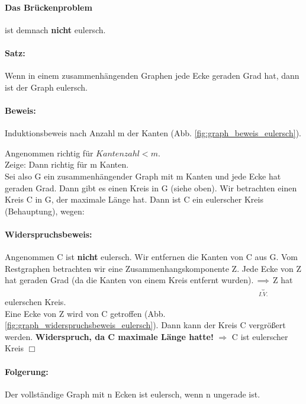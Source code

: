 \paragraph{Das Brückenproblem} ist demnach \textbf{nicht} eulersch. 

\paragraph{Satz:} Wenn in einem zusammenhängenden Graphen jede Ecke geraden Grad hat, dann ist der Graph eulersch. 

\paragraph{Beweis:} Induktionsbeweis nach Anzahl m der Kanten (Abb. \ref{fig:graph_beweis_eulersch}).




Angenommen richtig für $Kantenzahl < m$. \\
Zeige: Dann richtig für m Kanten.\\
Sei also G ein zusammenhängender Graph mit m Kanten und jede Ecke hat geraden Grad. Dann gibt es einen Kreis in G (siehe oben). Wir betrachten einen Kreis C in G, der maximale Länge hat. Dann ist C ein eulerscher Kreis (Behauptung), wegen: \\

\paragraph{Widerspruchsbeweis:} Angenommen C ist \textbf{nicht} eulersch. Wir entfernen die Kanten von C aus G. Vom Restgraphen betrachten wir eine Zusammenhangskomponente Z. Jede Ecke von Z hat geraden Grad (da die Kanten von einem Kreis entfernt wurden). $\underbrace{\Rightarrow}_{I.V.}$ Z hat eulerschen Kreis.\\
Eine Ecke von Z wird von C getroffen (Abb. \ref{fig:graph_widerspruchsbeweis_eulersch}). Dann kann der Kreis C vergrößert werden. \textbf{Widerspruch, da C maximale Länge hatte!} $\Rightarrow$ C ist eulerscher Kreis $\Box$  




\paragraph{Folgerung:}Der vollständige Graph mit n Ecken ist eulersch, wenn n ungerade ist. 

